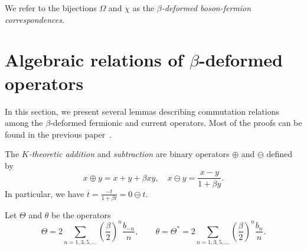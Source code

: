 \documentclass{amsart}
\begin{document}
We refer to the bijections $\Omega$ and $\chi$ as the \textit{$\beta$-deformed boson-fermion correspondences}.


\section{Algebraic relations of $\beta$-deformed operators}\label{sec:comm_rel}


In this section, we present several lemmas describing commutation relations among the $\beta$-deformed fermionic and current operators.
Most of the proofs can be found in the previous paper~\cite{iwao2021neutralfermionic}.

The \textit{$K$-theoretic addition} and \textit{subtraction} are binary operators $\oplus$ and $\ominus$ defined by
\[
x\oplus y=x+y+\beta xy,\quad
x\ominus y=\frac{x-y}{1+\beta y}.
\]
In particular, we have $\overline{t}=\frac{-t}{1+\beta t}=0\ominus t$.

Let $\Theta$ and $\theta$ be the operators
\[
\Theta=2
\sum_{n=1,3,5,\dots}\left(\frac{\beta}{2}\right)^n\frac{b_{-n}}{n},\qquad
\theta=
\Theta^\ast=
2
\sum_{n=1,3,5,\dots}\left(\frac{\beta}{2}\right)^n\frac{b_{n}}{n}.
\]
\end{document}
